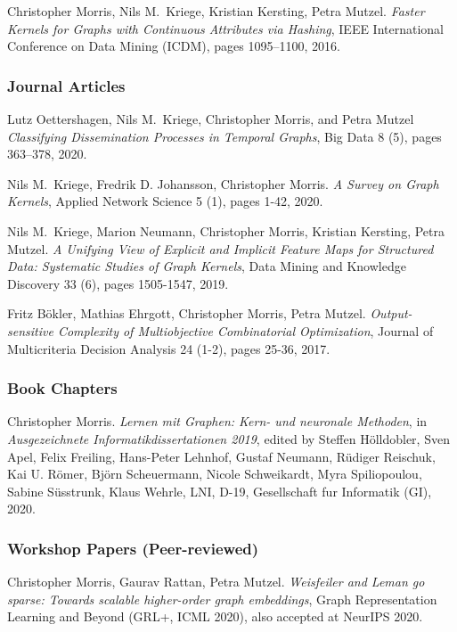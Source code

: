 \documentclass[11pt, a4paper, DIV=12]{scrartcl}
\begin{document}
\begin{thebibliography}{5}
    Christopher Morris, Nils M.~Kriege, Kristian Kersting, Petra Mutzel.
	\emph{Faster Kernels for Graphs with Continuous Attributes via Hashing},
	IEEE International Conference on Data Mining (ICDM), pages 1095--1100, 2016.
\subsubsection*{Journal Articles}

Lutz Oettershagen, Nils M.~Kriege, Christopher Morris, and Petra Mutzel
\emph{Classifying Dissemination Processes in Temporal Graphs},
Big Data 8 (5), pages 363--378, 2020.

Nils M.~Kriege,  Fredrik D. Johansson, Christopher Morris.
\emph{A Survey on Graph Kernels},
Applied Network Science 5 (1), pages 1-42, 2020.

Nils M.~Kriege,  Marion Neumann, Christopher Morris, Kristian Kersting, Petra Mutzel.
\emph{A Unifying View of Explicit and Implicit Feature Maps for Structured Data: Systematic Studies of Graph Kernels},
Data Mining and Knowledge Discovery 33 (6), pages 1505-1547, 2019.

Fritz B\"okler, Mathias Ehrgott, Christopher Morris, Petra Mutzel.
\emph{Output-sensitive Complexity of Multiobjective Combinatorial Optimization},
Journal of Multicriteria Decision Analysis 24 (1-2), pages 25-36, 2017.

\subsubsection*{Book Chapters}
Christopher Morris.
\emph{Lernen mit Graphen: Kern- und neuronale Methoden}, in 
\emph{Ausgezeichnete Informatikdissertationen 2019}, edited by Steffen H{\"o}lldobler, Sven Apel, Felix Freiling, Hans-Peter Lehnhof, Gustaf Neumann, R{\"u}diger Reischuk, Kai U. R{\"o}mer, Bj{\"o}rn Scheuermann, Nicole Schweikardt, Myra Spiliopoulou, Sabine S{\"u}sstrunk, Klaus Wehrle, LNI, D-19, Gesellschaft fur Informatik (GI), 2020. 

\subsubsection*{Workshop Papers (Peer-reviewed)}

Christopher Morris, Gaurav Rattan, Petra Mutzel.
\emph{Weisfeiler and Leman go sparse: Towards scalable higher-order graph embeddings},
Graph Representation Learning and Beyond (GRL+, ICML 2020), also accepted at NeurIPS 2020.


\end{thebibliography}
\end{document}
